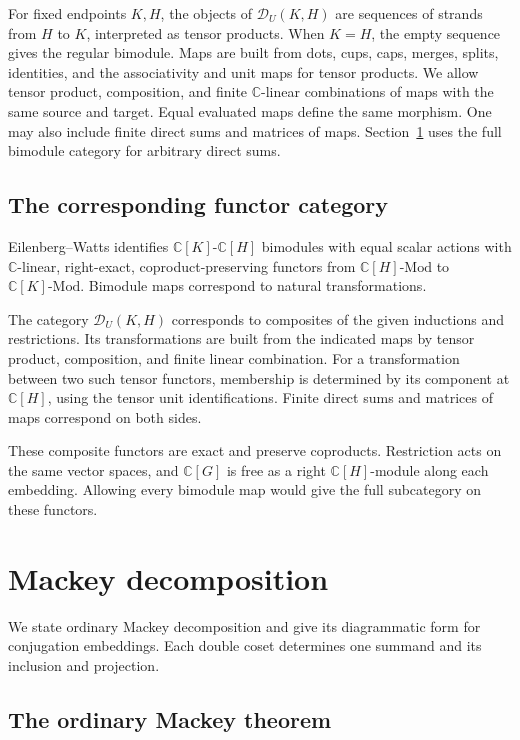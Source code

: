 \documentclass[11pt,a4paper]{article}
\numberwithin{equation}{section}
\theoremstyle{definition}
\newcommand{\C}{\mathbb C}
\newcommand{\Mod}{\text{-}\mathrm{Mod}}
\begin{document}
For fixed endpoints \(K,H\), the objects of \(\mathcal D_U(K,H)\)
are sequences of strands from \(H\) to \(K\), interpreted as tensor
products. When \(K=H\), the empty sequence gives the regular bimodule.
Maps are built from dots, cups, caps, merges, splits, identities,
and the associativity and unit maps for tensor products. We allow
tensor product, composition, and finite \(\C\)-linear combinations of
maps with the same source and target. Equal evaluated maps define
the same morphism. One may also include finite direct sums and
matrices of maps. Section~\ref{sec:mackey} uses the full bimodule
category for arbitrary direct sums.

\subsection{The corresponding functor category}\label{sec:functors}

Eilenberg--Watts identifies \(\C[K]\)-\(\C[H]\) bimodules with equal
scalar actions with \(\C\)-linear, right-exact, coproduct-preserving
functors from \(\C[H]\Mod\) to \(\C[K]\Mod\). Bimodule maps
correspond to natural transformations.

The category \(\mathcal D_U(K,H)\) corresponds to composites of the
given inductions and restrictions. Its transformations are built
from the indicated maps by tensor product, composition, and finite
linear combination. For a transformation between two such tensor
functors, membership is determined by its component at \(\C[H]\),
using the tensor unit identifications. Finite direct sums and
matrices of maps correspond on both sides.

These composite functors are exact and preserve coproducts.
Restriction acts on the same vector spaces, and \(\C[G]\) is free as
a right \(\C[H]\)-module along each embedding. Allowing every bimodule
map would give the full subcategory on these functors.

\section{Mackey decomposition}\label{sec:mackey}

We state ordinary Mackey decomposition and give its diagrammatic
form for conjugation embeddings. Each double coset determines one
summand and its inclusion and projection.
\subsection{The ordinary Mackey theorem}
\end{document}
